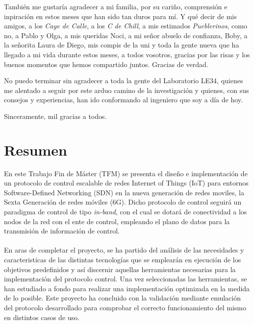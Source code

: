 También me gustaría agradecer a mi familia, por su cariño, comprensión e inpiración en estos meses que han sido tan duros para mí. 	Y qué decir de mis amigos, a los \textit{Caye de Calle}, a los \textit{C de Chill},  a mis estimados \textit{Pueblerinos}, como no, a Pablo y Olga, a mis queridas Noci, a mi señor abuelo de confianza, Boby, a la señorita Laura de Diego, mis compis de la uni y toda la gente nueva que ha llegado a mi vida durante estos meses, a todos vosotros, gracias por las risas y los buenos momentos que hemos compartido juntos. Gracias de verdad. \newline


No puedo terminar sin agradecer a toda la gente del Laboratorio LE34, quienes me alentado a seguir por este arduo camino de la investigación y quienes, con sus consejos y experiencias, han ido conformando al ingeniero que soy a día de hoy.

\vspace{0.5cm}

Sinceramente, mil gracias a todos.




\cleardoublepage %



\chapter{Resumen}
\thispagestyle{empty}
En este Trabajo Fin de Máster (TFM) se presenta el diseño e implementación de un protocolo de control escalable de redes Internet of Things (IoT) para entornos Software-Defined Networking (SDN) en la nueva generación de redes moviles, la Sexta Generación de redes móviles (6G). Dicho protocolo de control seguirá un paradigma de control de tipo \textit{in-band}, con el cual se dotará de conectividad a los nodos de la red con el ente de control, empleando el plano de datos para la transmisión de información de control.\\
\\
En aras de completar el proyecto,  se ha partido del análisis de las necesidades y caracteristicas de las distintas tecnologías que se emplearán en ejecución de los objetivos predefinidos y así discernir aquellas herramientas necesarias para la implementación del protocolo control. Una vez seleccionadas las herramientas, se han estudiado a fondo para realizar una implementación optimizada en la medida de lo posible. Este proyecto ha concluido con la validación mediante emulación del protocolo desarrollado para comprobar el correcto funcionamiento del mismo en distintos casos de uso.

